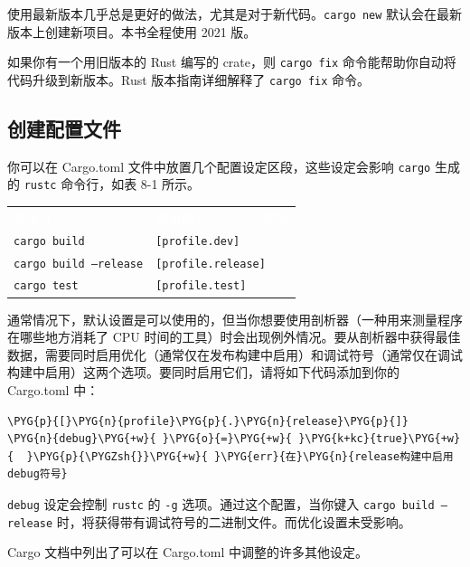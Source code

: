 使用最新版本几乎总是更好的做法，尤其是对于新代码。\texttt{cargo new} 默认会在最新版本上创建新项目。本书全程使用 2021 版。

如果你有一个用旧版本的 Rust 编写的 crate，则 \texttt{cargo fix} 命令能帮助你自动将代码升级到新版本。Rust 版本指南详细解释了 \texttt{cargo fix} 命令。

\subsection{创建配置文件}

你可以在 Cargo.toml 文件中放置几个配置设定区段，这些设定会影响 \texttt{cargo} 生成的 \texttt{rustc} 命令行，如表 8-1 所示。


\myTableBegin
\begin{tabularx}{\textwidth}{@{}>{\hsize=1.040\hsize\raggedright\arraybackslash}X>{\hsize=0.960\hsize\raggedright\arraybackslash}X@{}}
\rowcolor{tabhead}\textcolor{white}{命令行} & \textcolor{white}{使用的 Cargo.toml 区段} \\
\texttt{cargo build} & \texttt{[profile.dev]} \\
\texttt{cargo build --release} & \texttt{[profile.release]} \\
\texttt{cargo test} & \texttt{[profile.test]} \\
\end{tabularx}
\myTableEnd

通常情况下，默认设置是可以使用的，但当你想要使用剖析器（一种用来测量程序在哪些地方消耗了 CPU 时间的工具）时会出现例外情况。要从剖析器中获得最佳数据，需要同时启用优化（通常仅在发布构建中启用）和调试符号（通常仅在调试构建中启用）这两个选项。要同时启用它们，请将如下代码添加到你的 Cargo.toml 中：

\begin{Verbatim}[commandchars=\\\{\},breaklines=true,breakanywhere=true,fontsize=\codefont,xleftmargin=17bp]
\PYG{p}{[}\PYG{n}{profile}\PYG{p}{.}\PYG{n}{release}\PYG{p}{]}
\PYG{n}{debug}\PYG{+w}{ }\PYG{o}{=}\PYG{+w}{ }\PYG{k+kc}{true}\PYG{+w}{  }\PYG{p}{\PYGZsh{}}\PYG{+w}{ }\PYG{err}{在}\PYG{n}{release构建中启用debug符号}
\end{Verbatim}

\texttt{debug} 设定会控制 \texttt{rustc} 的 \texttt{-g} 选项。通过这个配置，当你键入 \texttt{cargo build --release} 时，将获得带有调试符号的二进制文件。而优化设置未受影响。

Cargo 文档中列出了可以在 Cargo.toml 中调整的许多其他设定。

